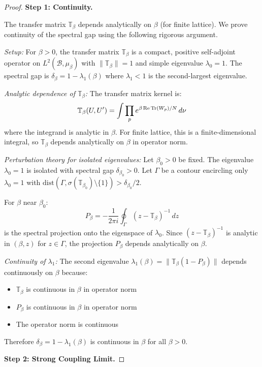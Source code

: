\begin{proof}
\textbf{Step 1: Continuity.}

The transfer matrix $\mathbb{T}_\beta$ depends analytically on $\beta$ (for finite lattice). 
We prove continuity of the spectral gap using the following rigorous argument.

\textit{Setup:} For $\beta > 0$, the transfer matrix $\mathbb{T}_\beta$ is a compact, 
positive self-adjoint operator on $L^2(\mathcal{B}, \mu_\beta)$ with $\|\mathbb{T}_\beta\| = 1$ 
and simple eigenvalue $\lambda_0 = 1$. The spectral gap is 
$\delta_\beta = 1 - \lambda_1(\beta)$ where $\lambda_1 < 1$ is the second-largest eigenvalue.

\textit{Analytic dependence of $\mathbb{T}_\beta$:} The transfer matrix kernel is:
\[
\mathbb{T}_\beta(U, U') = \int \prod_{p} e^{\beta \operatorname{Re}\operatorname{Tr}(W_p)/N} \, d\nu
\]
where the integrand is analytic in $\beta$. For finite lattice, this is a finite-dimensional 
integral, so $\mathbb{T}_\beta$ depends analytically on $\beta$ in operator norm.

\textit{Perturbation theory for isolated eigenvalues:} Let $\beta_0 > 0$ be fixed. 
The eigenvalue $\lambda_0 = 1$ is isolated with spectral gap $\delta_{\beta_0} > 0$. 
Let $\Gamma$ be a contour encircling only $\lambda_0 = 1$ with $\text{dist}(\Gamma, \sigma(\mathbb{T}_{\beta_0}) \setminus \{1\}) > \delta_{\beta_0}/2$.

For $\beta$ near $\beta_0$:
\[
P_\beta = -\frac{1}{2\pi i} \oint_\Gamma (z - \mathbb{T}_\beta)^{-1} \, dz
\]
is the spectral projection onto the eigenspace of $\lambda_0$. Since $(z - \mathbb{T}_\beta)^{-1}$ 
is analytic in $(\beta, z)$ for $z \in \Gamma$, the projection $P_\beta$ depends analytically 
on $\beta$.

\textit{Continuity of $\lambda_1$:} The second eigenvalue $\lambda_1(\beta) = \|\mathbb{T}_\beta(1 - P_\beta)\|$ 
depends continuously on $\beta$ because:
\begin{itemize}
\item $\mathbb{T}_\beta$ is continuous in $\beta$ in operator norm
\item $P_\beta$ is continuous in $\beta$ in operator norm
\item The operator norm is continuous
\end{itemize}

Therefore $\delta_\beta = 1 - \lambda_1(\beta)$ is continuous in $\beta$ for all $\beta > 0$.

\textbf{Step 2: Strong Coupling Limit.}


\end{proof}
